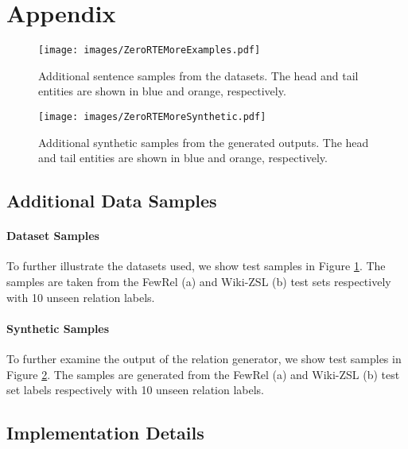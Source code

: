 \documentclass[11pt]{article}
\begin{document}



\clearpage
\newpage

\appendix
\section{Appendix}
\label{sec:appendix}



\begin{figure}[t!]
\centering
\texttt{[image: images/ZeroRTEMoreExamples.pdf]}
\caption{
Additional sentence samples from the datasets.
The head and tail entities are shown in blue and orange, respectively.
}
\label{fig:more_examples}
\end{figure}

\begin{figure}[t!]
\centering
\texttt{[image: images/ZeroRTEMoreSynthetic.pdf]}
\caption{
Additional synthetic samples from the generated outputs.
The head and tail entities are shown in blue and orange, respectively.
}
\label{fig:more_synthetic}
\end{figure}

\subsection{Additional Data Samples}
\label{sec:more_samples}



\paragraph{Dataset Samples}
To further illustrate the datasets used, we show test samples in Figure \ref{fig:more_examples}.
The samples are taken from the FewRel (a) and Wiki-ZSL (b) test sets respectively with 10 unseen relation labels.





\paragraph{Synthetic Samples}
To further examine the output of the relation generator, we show test samples in Figure \ref{fig:more_synthetic}.
The samples are generated from the FewRel (a) and Wiki-ZSL (b) test set labels respectively with 10 unseen relation labels.

\subsection{Implementation Details}
\label{sec:implementation}
\end{document}

